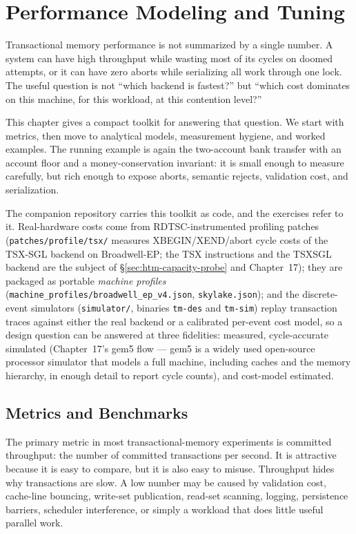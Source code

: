 \chapter{Performance Modeling and Tuning}

Transactional memory performance is not summarized by a single number. A system can have high throughput while wasting most of its cycles on doomed attempts, or it can have zero aborts while serializing all work through one lock. The useful question is not ``which backend is fastest?'' but ``which cost dominates on this machine, for this workload, at this contention level?''

This chapter gives a compact toolkit for answering that question. We start with metrics, then move to analytical models, measurement hygiene, and worked examples. The running example is again the two-account bank transfer with an account floor and a money-conservation invariant: it is small enough to measure carefully, but rich enough to expose aborts, semantic rejects, validation cost, and serialization.

The companion repository carries this toolkit as code, and the exercises refer to it. Real-hardware costs come from RDTSC-instrumented profiling patches (\texttt{patches/profile/tsx/} measures XBEGIN/XEND/abort cycle costs of the TSX-SGL backend on Broadwell-EP; the TSX instructions and the TSXSGL backend are the subject of \S\ref{sec:htm-capacity-probe} and Chapter~17); they are packaged as portable \emph{machine profiles} (\texttt{machine\_profiles/broadwell\_ep\_v4.json}, \texttt{skylake.json}); and the discrete-event simulators (\texttt{simulator/}, binaries \texttt{tm-des} and \texttt{tm-sim}) replay transaction traces against either the real backend or a calibrated per-event cost model, so a design question can be answered at three fidelities: measured, cycle-accurate simulated (Chapter~17's gem5 flow --- gem5 is a widely used open-source processor simulator that models a full machine, including caches and the memory hierarchy, in enough detail to report cycle counts), and cost-model estimated.

\section{Metrics and Benchmarks}

The primary metric in most transactional-memory experiments is committed throughput: the number of committed transactions per second. It is attractive because it is easy to compare, but it is also easy to misuse. Throughput hides why transactions are slow. A low number may be caused by validation cost, cache-line bouncing, write-set publication, read-set scanning, logging, persistence barriers, scheduler interference, or simply a workload that does little useful parallel work.

